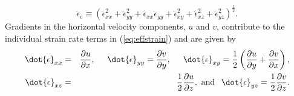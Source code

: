 \documentclass[tc, manuscript]{copernicus}
\begin{document}
\begin{equation} \label{eq:effstrain}
\dot{\epsilon}_e \equiv \left( \dot{\epsilon}_{xx}^2 +
\dot{\epsilon}_{yy}^2 + \dot{\epsilon}_{xx} \dot{\epsilon}_{yy} +
\dot{\epsilon}_{xy}^2 + \dot{\epsilon}_{xz}^2 +
\dot{\epsilon}_{yz}^2 \right)^\frac{1}{2}.
\end{equation}
Gradients in the horizontal velocity components, $u$ and $v$, contribute to the individual strain rate terms in (\ref{eq:effstrain}) and are given by
\begin{eqnarray} \label{eq:epsilonij}
\dot{\epsilon}_{xx} &=& \frac{\partial u}{\partial x}, \hspace{0.5cm} 
\dot{\epsilon}_{yy} = \frac{\partial v}{\partial y}, \hspace{0.5cm}
\dot{\epsilon}_{xy} = \frac{1}{2}\left(\frac{\partial u}{\partial y} + \frac{\partial v}{\partial x} \right), \nonumber\\ 
\dot{\epsilon}_{xz} &=& \frac{1}{2} \frac{\partial u}{\partial z}, \textrm{ and } \hspace{0.15cm} 
\dot{\epsilon}_{yz} = \frac{1}{2} \frac{\partial v}{\partial z}.
\end{eqnarray}
\end{document}
